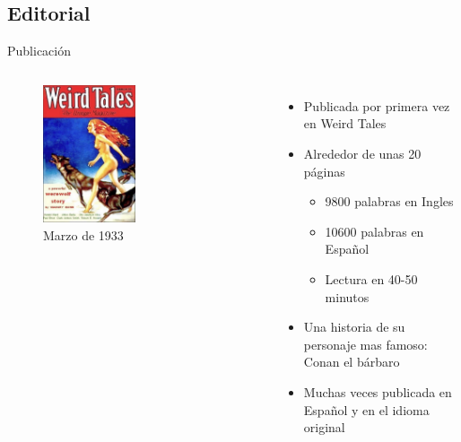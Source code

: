 \subsection{Editorial}
\begin{frame}{Publicación}
\begin{columns}
    \begin{figure}[htb]
    \centering
        \includegraphics[width=0.5\textwidth]{img/WeirdTales-1933-03}
        \caption{Marzo de 1933}
    \end{figure}
    \begin{itemize}
         \item Publicada por primera vez en Weird Tales
         \item Alrededor de unas 20 páginas
         \begin{itemize}
            \item 9800 palabras en Ingles
            \item 10600 palabras en Español
            \item Lectura en 40-50 minutos
         \end{itemize}
         \item Una historia de su personaje mas famoso: Conan el bárbaro
         \item Muchas veces publicada en Español y en el idioma original
    \end{itemize}
\end{columns}
\end{frame}

